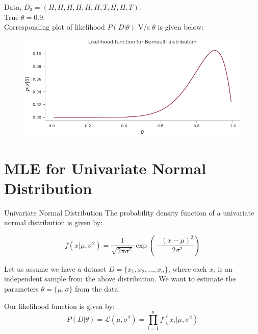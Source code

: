 \documentclass[handout]{beamer}
\begin{document}
\begin{frame}
    Data, $D_3 = (H,H,H,H,H,H,T,H,H,T)$. \\True $\theta=0.9.$ \\Corresponding plot of likelihood $P(D|\theta)$ V/s $\theta$ is given below:
    \begin{figure}
                \centerline{\includegraphics[scale = 0.75]{../figures/mle/bernoulli_likelihood_2.pdf}}
\end{figure}
\end{frame}



\section{MLE for Univariate Normal Distribution}

\begin{frame}{Univariate Normal Distribution}
The probability density function of a univariate normal distribution is given by:

\begin{equation}
f(x|\mu, \sigma^2) = \frac{1}{\sqrt{2\pi\sigma^2}}\exp\left(-\frac{(x-\mu)^2}{2\sigma^2}\right)
\end{equation}

Let us assume we have a dataset $D = \{x_1, x_2, \ldots, x_n\}$, where each $x_i$ is an independent sample from the above distribution. 
We want to estimate the parameters $\theta = \{\mu, \sigma\}$ from the data.

Our likelihood function is given by:
\begin{equation}
P(D|\theta) = \mathcal{L}(\mu, \sigma^2) = \prod_{i=1}^n f(x_i|\mu, \sigma^2)
\end{equation}


\end{frame}
\end{document}
